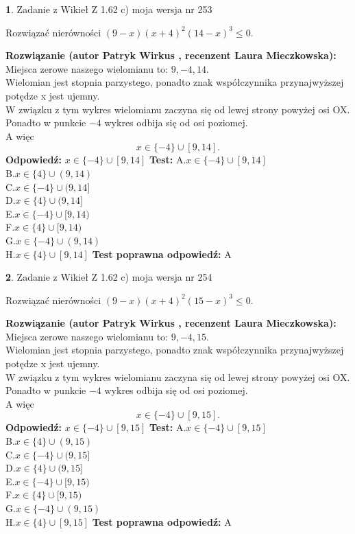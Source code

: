 \documentclass[12pt, a4paper]{article}
\theoremstyle{definition} %
\newtheorem{zad}{}
\newcommand{\zadStart}[1]{\begin{zad}#1\newline}
\newcommand{\zadStop}{\end{zad}}
\newcommand{\rozwStart}[2]{\noindent \textbf{Rozwiązanie (autor #1 , recenzent #2): }\newline}
\newcommand{\rozwStop}{\newline}
\newcommand{\odpStart}{\noindent \textbf{Odpowiedź:}\newline}
\newcommand{\odpStop}{\newline}
\newcommand{\testStart}{\noindent \textbf{Test:}\newline}
\newcommand{\testStop}{\newline}
\newcommand{\kluczStart}{\noindent \textbf{Test poprawna odpowiedź:}\newline}
\newcommand{\kluczStop}{\newline}
\begin{document}
\zadStart{Zadanie z Wikieł Z 1.62 c) moja wersja nr 253}

Rozwiązać nierówności $(9-x)(x+4)^{2}(14-x)^{3}\le0$.
\zadStop
\rozwStart{Patryk Wirkus}{Laura Mieczkowska}
Miejsca zerowe naszego wielomianu to: $9, -4, 14$.\\
Wielomian jest stopnia parzystego, ponadto znak współczynnika przy\linebreak najwyższej potędze x jest ujemny.\\ W związku z tym wykres wielomianu zaczyna się od lewej strony powyżej osi OX.\\
Ponadto w punkcie $-4$ wykres odbija się od osi poziomej.\\
A więc $$x \in \{-4\} \cup [9,14].$$
\rozwStop
\odpStart
$x \in \{-4\} \cup [9,14]$
\odpStop
\testStart
A.$x \in \{-4\} \cup [9,14]$\\
B.$x \in \{4\} \cup (9,14)$\\
C.$x \in \{-4\} \cup (9,14]$\\
D.$x \in \{4\} \cup (9,14]$\\
E.$x \in \{-4\} \cup [9,14)$\\
F.$x \in \{4\} \cup [9,14)$\\
G.$x \in \{-4\} \cup (9,14)$\\
H.$x \in \{4\} \cup [9,14]$
\testStop
\kluczStart
A
\kluczStop



\zadStart{Zadanie z Wikieł Z 1.62 c) moja wersja nr 254}

Rozwiązać nierówności $(9-x)(x+4)^{2}(15-x)^{3}\le0$.
\zadStop
\rozwStart{Patryk Wirkus}{Laura Mieczkowska}
Miejsca zerowe naszego wielomianu to: $9, -4, 15$.\\
Wielomian jest stopnia parzystego, ponadto znak współczynnika przy\linebreak najwyższej potędze x jest ujemny.\\ W związku z tym wykres wielomianu zaczyna się od lewej strony powyżej osi OX.\\
Ponadto w punkcie $-4$ wykres odbija się od osi poziomej.\\
A więc $$x \in \{-4\} \cup [9,15].$$
\rozwStop
\odpStart
$x \in \{-4\} \cup [9,15]$
\odpStop
\testStart
A.$x \in \{-4\} \cup [9,15]$\\
B.$x \in \{4\} \cup (9,15)$\\
C.$x \in \{-4\} \cup (9,15]$\\
D.$x \in \{4\} \cup (9,15]$\\
E.$x \in \{-4\} \cup [9,15)$\\
F.$x \in \{4\} \cup [9,15)$\\
G.$x \in \{-4\} \cup (9,15)$\\
H.$x \in \{4\} \cup [9,15]$
\testStop
\kluczStart
A
\kluczStop
\end{document}
